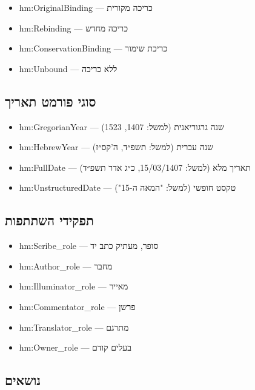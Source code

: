 \documentclass[12pt,a4paper]{article}
\newcommand{\new}[1]{\textcolor{newaddition}{#1}}
\begin{document}
\begin{itemize}
\item hm:OriginalBinding — כריכה מקורית
\item hm:Rebinding — כריכה מחדש
\item hm:ConservationBinding — כריכת שימור
\item hm:Unbound — ללא כריכה
\end{itemize}

\subsection{\new{סוגי פורמט תאריך}}

\begin{itemize}
\item \new{hm:GregorianYear — שנה גרגוריאנית (למשל: 1407, 1523)}
\item \new{hm:HebrewYear — שנה עברית (למשל: תשפ״ד, ה'קס״ז)}
\item \new{hm:FullDate — תאריך מלא (למשל: 15/03/1407, כ״ג אדר תשפ״ד)}
\item \new{hm:UnstructuredDate — טקסט חופשי (למשל: "המאה ה-15")}
\end{itemize}

\subsection{תפקידי השתתפות}

\begin{itemize}
\item hm:Scribe\_role — סופר, מעתיק כתב יד
\item hm:Author\_role — מחבר
\item hm:Illuminator\_role — מאייר
\item hm:Commentator\_role — פרשן
\item hm:Translator\_role — מתרגם
\item hm:Owner\_role — בעלים קודם
\end{itemize}

\subsection{נושאים}
\end{document}

